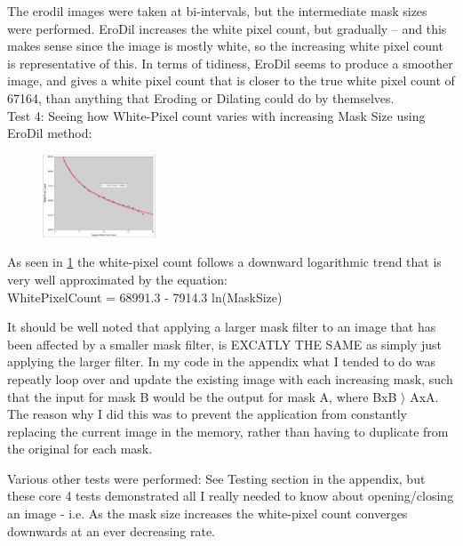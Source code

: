 \documentclass[11pt]{article} %
\begin{document}
The erodil images were taken at bi-intervals, but the intermediate mask sizes were performed.  EroDil increases the white pixel count, but gradually -- and this makes sense since the image is mostly white, so the increasing white pixel count is representative of this. In terms of tidiness, EroDil seems to produce a smoother image, and gives a white pixel count that is closer to the true white pixel count of 67164, than anything that Eroding or Dilating could do by themselves.
\\Test 4: Seeing how White-Pixel count varies with increasing Mask Size using EroDil method:
\begin{figure}
	\vspace{-20pt}
	\begin{center}
		\includegraphics[width=0.3\textwidth]{../images/ImageOps/chartMask}
		\label{img:maskChart}
	\end{center}
\end{figure}
As seen in \cref{img:maskChart} the white-pixel count follows a downward logarithmic trend that is very well approximated by the equation:\\
WhitePixelCount = 68991.3 - 7914.3 ln(MaskSize)

It should be well noted that applying a larger mask filter to an image that has been affected by a smaller mask filter, is EXCATLY THE SAME as simply just applying the larger filter.  In my code in the appendix what I tended to do was repeatly loop over and update the existing image with each increasing mask, such that the input for mask B would be the output for mask A, where BxB \(\rangle\) AxA.  The reason why I did this was to prevent the application from constantly replacing the current image in the memory, rather than having to duplicate from the original for each mask.

Various other tests were performed: See Testing section in the appendix, but these core 4 tests demonstrated all I really needed to know about opening/closing an image - i.e. As the mask size increases the white-pixel count converges downwards at an ever decreasing rate.
\end{document}
